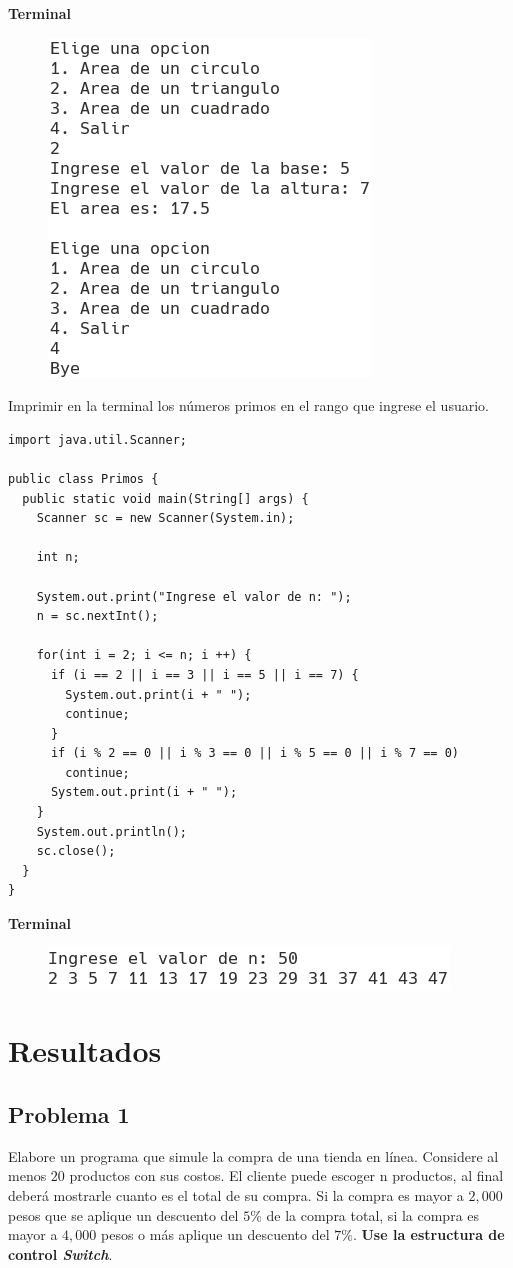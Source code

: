 \documentclass[11pt, twocolumn]{article}
\begin{document}
  \textbf{Terminal}
  \begin{figure}[ht]
    \includegraphics[width=0.5\columnwidth, center]{FG2.png}
  \end{figure} 

  Imprimir en la terminal los números primos en el rango que ingrese el usuario.

  \begin{lstlisting}
import java.util.Scanner;

public class Primos {
  public static void main(String[] args) {
    Scanner sc = new Scanner(System.in);

    int n;

    System.out.print("Ingrese el valor de n: ");
    n = sc.nextInt();

    for(int i = 2; i <= n; i ++) {
      if (i == 2 || i == 3 || i == 5 || i == 7) {
        System.out.print(i + " ");
        continue;
      }
      if (i % 2 == 0 || i % 3 == 0 || i % 5 == 0 || i % 7 == 0)
        continue;
      System.out.print(i + " ");
    }
    System.out.println();
    sc.close();
  }
}
  \end{lstlisting}

  \textbf{Terminal}
  \begin{figure}[ht]
    \includegraphics[width=0.75\columnwidth, center]{Primos.png}
  \end{figure} 

  \section*{Resultados}
  \subsection*{Problema 1}
  Elabore un programa que simule la compra de una tienda en línea. Considere al menos $20$ productos con sus costos. El cliente puede escoger n productos, al final deberá mostrarle cuanto es el total de su compra. Si la compra es mayor a $2,000$ pesos que se aplique un descuento del $5\%$ de la compra total, si la compra es mayor a $4,000$ pesos o más aplique un descuento del $7\%$. \textbf{Use la estructura de control \textit{Switch}}.
\end{document}
